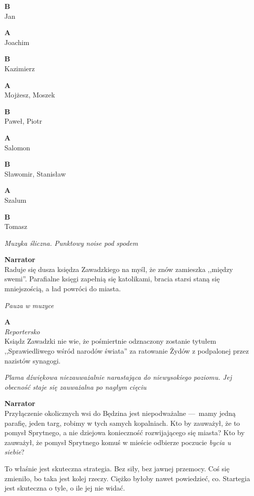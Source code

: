 \documentclass[11pt,a4paper,oneside]{article}
\begin{document}
\textbf{B}\\
Jan

\textbf{A}\\
Joachim

\textbf{B}\\
Kazimierz

\textbf{A}\\
Mojżesz,  Moszek

\textbf{B}\\
Paweł, Piotr

\textbf{A}\\
Salomon

\textbf{B}\\
Sławomir,  Stanisław

\textbf{A}\\
Szalum

\textbf{B}\\
Tomasz

{\color{light-gray} \emph{Muzyka śliczna. Punktowy noise pod spodem}}

\textbf{Narrator}\\
Raduje się dusza księdza Zawadzkiego na myśl, że znów zamieszka
,,między swemi''. Parafialne księgi zapełnią się katolikami, 
bracia starsi staną się mniejszością, a ład powróci do miasta.

{\color{light-gray} \emph{Pauza w muzyce}}

\textbf{A}\\
{\color{light-gray} \emph{Reportersko}}\\
Ksiądz Zawadzki nie wie, że pośmiertnie odznaczony zostanie tytułem
,,Sprawiedliwego wśród narodów świata'' za ratowanie Żydów
z podpalonej przez nazistów synagogi.

{\color{light-gray} \emph{Plama dźwiękowa niezauważalnie narastająca
do niewysokiego poziomu. Jej obecność staje się zauważalna po nagłym
cięciu}}

\textbf{Narrator}\\
Przyłączenie okolicznych wsi do Będzina jest niepodważalne \mbox{---}~mamy
jedną parafię, jeden targ, robimy w  tych samych kopalniach. Kto by
zauważył, że to pomysł Sprytnego, a nie dziejowa konieczność
rozwijającego się miasta?  Kto by zauważył, że pomysł Sprytnego komuś
w mieście odbierze poczucie \emph{bycia u siebie}?

To właśnie jest skuteczna strategia. Bez siły, bez jawnej przemocy.
Coś się zmieniło, bo taka jest kolej rzeczy.  Ciężko byłoby nawet
powiedzieć, co. Startegia jest skuteczna o tyle, o ile jej nie widać. 
\end{document}

